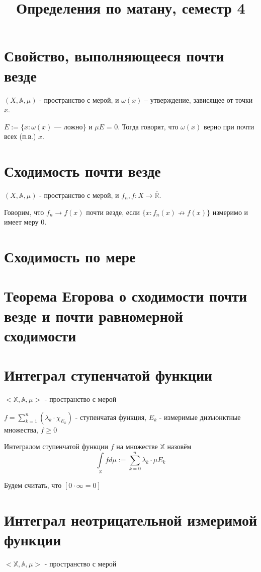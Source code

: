 \documentclass[paper=a4, fontsize=15pt]{article}
\title{Определения по матану, семестр 4}
\begin{document}
\maketitle
\tableofcontents
\newpage

\section{Свойство, выполняющееся почти везде}
$ (X,\mathds{A},\mu)$  - пространство с мерой, и $\omega (x)$  -- утверждение, зависящее от точки $x$.

$E := \{x: \omega(x) $ --- ложно\} и $\mu E$ = 0. Тогда говорят, что $\omega (x)$ верно при почти всех (п.в.) $x$.

\section{Сходимость почти везде}
$ (X,\mathds{A},\mu)$  - пространство с мерой, и $f_n, f: X \rightarrow \overline{\mathds{R}}.$

Говорим, что $f_n \rightarrow f(x)$ почти везде, если $\{x: f_n(x) \not \rightarrow f(x)\}$ измеримо и имеет меру $0$.

\section{Сходимость по мере}

\section{Теорема Егорова о сходимости почти везде и почти равномерной сходимости}

\section{Интеграл ступенчатой функции}
$<\mathds{X}, \mathds{A}, \mu>$ - пространство с мерой

$f = \sum\limits_{k = 1}^{n}(\lambda_k \cdot \chi_{E_k})$ - ступенчатая функция, $E_k$ - измеримые дизъюнктные множества, $f \geqslant 0$

Интегралом ступенчатой функции $f$ на множестве $\mathds{X}$ назовём $$\int\limits_\mathds{X} f d\mu := \sum\limits_{k = 0}^{n} \lambda_k \cdot \mu E_k$$

Будем считать, что $[0 \cdot \infty = 0]$

\section{Интеграл неотрицательной измеримой функции}
$<\mathds{X}, \mathds{A}, \mu>$ - пространство с мерой
\end{document}
